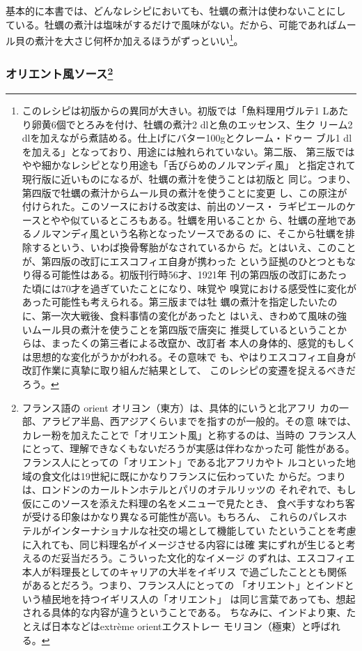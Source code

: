 \begin{recette}
基本的に本書では、どんなレシピにおいても、牡蠣の煮汁は使わないことにし
ている。牡蠣の煮汁は塩味がするだけで風味がない。だから、可能であればムー
ル貝の煮汁を大さじ何杯か加えるほうがずっといい\footnote{このレシピは初版からの異同が大きい。初版では「魚料理用ヴルテ1
  Lあたり卵黄6個でとろみを付け、牡蠣の煮汁2 dlと魚のエッセンス、生ク
  リーム2 dlを加えながら煮詰める。仕上げにバター100gとクレーム・ドゥー
  ブル1 dlを加える」となっており、用途には触れられていない。第二版、
  第三版ではやや細かなレシピとなり用途も「舌びらめのノルマンディ風」
  と指定されて現行版に近いものになるが、牡蠣の煮汁を使うことは初版と
  同じ。つまり、第四版で牡蠣の煮汁からムール貝の煮汁を使うことに変更
  し、この原注が付けられた。このソースにおける改変は、前出のソース・
  ラギピエールのケースとやや似ているところもある。牡蠣を用いることか
  ら、牡蠣の産地であるノルマンディ風という名称となったソースであるの
  に、そこから牡蠣を排除するという、いわば換骨奪胎がなされているから
  だ。とはいえ、このことが、第四版の改訂にエスコフィエ自身が携わった
  という証拠のひとつともなり得る可能性はある。初版刊行時56才、1921年
  刊の第四版の改訂にあたった頃には70才を過ぎていたことになり、味覚や
  嗅覚における感受性に変化があった可能性も考えられる。第三版までは牡
  蠣の煮汁を指定したいたのに、第一次大戦後、食料事情の変化があったと
  はいえ、きわめて風味の強いムール貝の煮汁を使うことを第四版で唐突に
  推奨しているということからは、まったくの第三者による改竄か、改訂者
  本人の身体的、感覚的もしくは思想的な変化がうかがわれる。その意味で
  も、やはりエスコフィエ自身が改訂作業に真摯に取り組んだ結果として、
  このレシピの変遷を捉えるべきだろう。}。

\maeaki

\hypertarget{ux30aaux30eaux30a8ux30f3ux30c8ux98a8ux30bdux30fcux30b9108}{%
\subsubsection[オリエント風ソース]{\texorpdfstring{オリエント風ソース\footnote{フランス語の
  orient オリヨン（東方）は、具体的にいうと北アフリ
  カの一部、アラビア半島、西アジアくらいまでを指すのが一般的。その意
  味では、カレー粉を加えたことで「オリエント風」と称するのは、当時の
  フランス人にとって、理解できなくもないだろうが実感は伴わなかった可
  能性がある。フランス人にとっての「オリエント」である北アフリカやト
  ルコといった地域の食文化は19世紀に既にかなりフランスに伝わっていた
  からだ。つまりは、ロンドンのカールトンホテルとパリのオテルリッツの
  それぞれで、もし仮にこのソースを添えた料理の名をメニューで見たとき、
  食べ手すなわち客が受ける印象はかなり異なる可能性が高い。もちろん、
  これらのパレスホテルがインターナショナルな社交の場として機能してい
  たということを考慮に入れても、同じ料理名がイメージさせる内容には確
  実にずれが生じると考えるのだ妥当だろう。こういった文化的なイメージ
  のずれは、エスコフィエ本人が料理長としてのキャリアの大半をイギリス
  で過ごしたこととも関係があるとだろう。つまり、フランス人にとっての
  「オリエント」とインドという植民地を持つイギリス人の「オリエント」
  は同じ言葉であっても、想起される具体的な内容が違うということである。
  ちなみに、インドより東、たとえば日本などはextrème orientエクストレー
  モリヨン（極東）と呼ばれる。}}{オリエント風ソース}}\label{ux30aaux30eaux30a8ux30f3ux30c8ux98a8ux30bdux30fcux30b9108}}


\end{recette}
